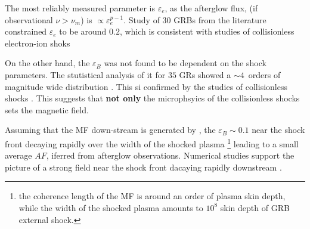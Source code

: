 The most reliably measured parameter is $\varepsilon_e$, as the afterglow flux, (if observational $\nu > \nu_m$) is $\propto \varepsilon_e^{p-1}$. Study of $30$ GRBs from the literature constrained $\varepsilon_e$ to be around $0.2$, which is consistent with studies of collisionless electron-ion shoks \cite{e.g. Sironi and Spitkovsky, 2011)} 

On the other hand, the $\varepsilon_B$ was not found to be dependent on the shock parameters. The stutistical analysis of it for $35$ GRs showed a $\sim 4$~orders of magnitude wide distribution \cite{Santana et al., 2014}. This si confirmed by the studies of collisionless shocks \cite{Sironi and Spitkovsky (2011)}. This suggests that \textbf{not only} the microphsyics of the collisionless shocks sets the magnetic field.


Assuming that the MF down-stream is generated by , the $\varepsilon_B \sim 0.1$ near the shock front \cite{Medvedev and Loeb, 1999).} decaying rapidly over the width of the shocked plasma
\footnote{
    the coherence length of the MF is around an order of plasma skin depth, while the width of the shocked plasma amounts to $10^8$ skin depth of GRB external shock.
}
leading to a small average $AF$, iferred from afterglow observations.
Numerical studies support the picture of a strong field near the shock front dacaying rapidly downstream \cite{Silva et al., 2003; Chang et al., 2008; Sironi and Spitkovsky, 2011}.

